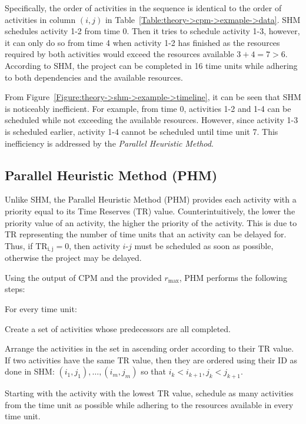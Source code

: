 Specifically, the order of activities in the sequence is identical to the order of activities in column $\left(i, j\right)$ in Table~\ref{Table:theory->cpm->exmaple->data}.
SHM schedules activity 1-2 from time 0.
Then it tries to schedule activity 1-3, however, it can only do so from time 4 when activity 1-2 has finished as the resources required by both activities would exceed the resources available $3 + 4 = 7 > 6$.
According to SHM, the project can be completed in 16 time units while adhering to both dependencies and the available resources.

From Figure~\ref{Figure:theory->shm->example->timeline}, it can be seen that SHM is noticeably inefficient.
For example, from time 0, activities 1-2 and 1-4 can be scheduled while not exceeding the available resources.
However, since activity 1-3 is scheduled earlier, activity 1-4 cannot be scheduled until time unit 7.
This inefficiency is addressed by the \textit{Parallel Heuristic Method}.



\subsection{Parallel Heuristic Method (PHM)}
Unlike SHM, the Parallel Heuristic Method (PHM) provides each activity with a priority equal to its Time Reserves (TR) value.
Counterintuitively, the lower the priority value of an activity, the higher the priority of the activity.
This is due to TR representing the number of time units that an activity can be delayed for.
Thus, if $\mathrm{TR_{i ,j}} = 0$, then activity $i$-$j$ must be scheduled as soon as possible, otherwise the project may be delayed.

Using the output of CPM and the provided $r_\mathrm{max}$, PHM performs the following steps:

\begin{tight_enumerate}
	\item For every time unit:
	\begin{tight_enumerate}
		\item Create a set of activities whose predecessors are all completed.
		\item Arrange the activities in the set in ascending order according to their TR value.
			If two activities have the same TR value, then they are ordered using their ID as done in SHM: $\left(i_1, j_1\right),  \ldots, \left(i_m, j_m\right)$ so that $i_k < i_{k+1}, j_k < j_{k+1}$.
		\item Starting with the activity with the lowest TR value, schedule as many activities from the time unit as possible while adhering to the resources available in every time unit.
	\end{tight_enumerate}
\end{tight_enumerate}

